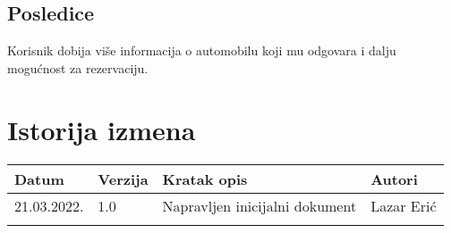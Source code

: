 \documentclass[12pt]{article}
\begin{document}
\subsection{Posledice}
Korisnik dobija više informacija o automobilu koji mu odgovara i dalju mogućnost za rezervaciju.

\section{Istorija izmena}
\begin{center}
\begin{tabular}{ | m{2cm} | m{1.5cm}| m{6cm} | m{5cm} | } 
\hline
Datum & Verzija & Kratak opis & Autori \\ 
\hline
 21.03.2022. & 1.0 & Napravljen inicijalni dokument & Lazar Erić\\ 
\hline
&&&\\ 
\hline
\end{tabular}
\end{center}
\end{document}
